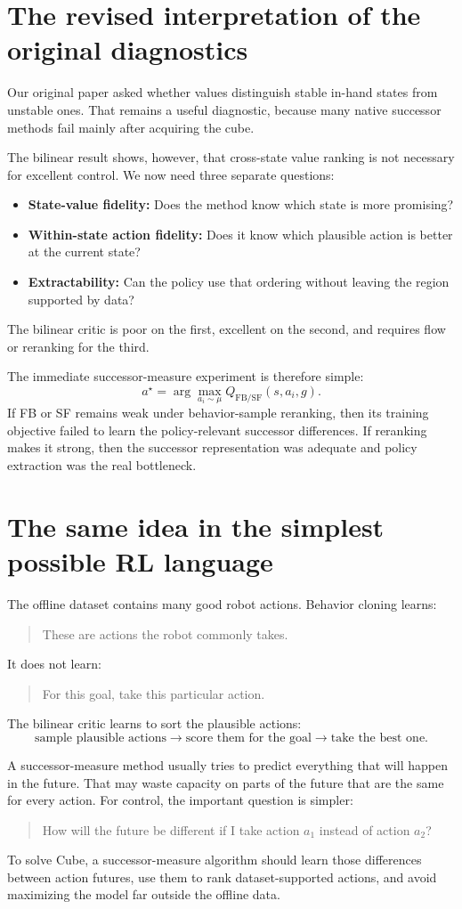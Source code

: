 \documentclass[12pt]{article}
\begin{document}
\section*{The revised interpretation of the original diagnostics}
Our original paper asked whether values distinguish stable in-hand states from unstable ones. That remains a useful diagnostic, because many native successor methods fail mainly after acquiring the cube. 

The bilinear result shows, however, that cross-state value ranking is not necessary for excellent control. We now need three separate questions:
\begin{itemize}
    \item \textbf{State-value fidelity:} Does the method know which state is more promising?
    \item \textbf{Within-state action fidelity:} Does it know which plausible action is better at the current state?
    \item \textbf{Extractability:} Can the policy use that ordering without leaving the region supported by data?
\end{itemize}

The bilinear critic is poor on the first, excellent on the second, and requires flow or reranking for the third.

The immediate successor-measure experiment is therefore simple:
$$ a^\star = \arg\max_{a_i\sim\mu} Q_{\mathrm{FB/SF}}(s,a_i,g). $$
If FB or SF remains weak under behavior-sample reranking, then its training objective failed to learn the policy-relevant successor differences. If reranking makes it strong, then the successor representation was adequate and policy extraction was the real bottleneck.

\section*{The same idea in the simplest possible RL language}
The offline dataset contains many good robot actions. Behavior cloning learns:
\begin{quote}
These are actions the robot commonly takes.
\end{quote}

It does not learn:
\begin{quote}
For this goal, take this particular action.
\end{quote}

The bilinear critic learns to sort the plausible actions:
$$ \text{sample plausible actions} \rightarrow \text{score them for the goal} \rightarrow \text{take the best one}. $$

A successor-measure method usually tries to predict everything that will happen in the future. That may waste capacity on parts of the future that are the same for every action. For control, the important question is simpler:
\begin{quote}
How will the future be different if I take action $a_1$ instead of action $a_2$?
\end{quote}

To solve Cube, a successor-measure algorithm should learn those differences between action futures, use them to rank dataset-supported actions, and avoid maximizing the model far outside the offline data.
\end{document}
